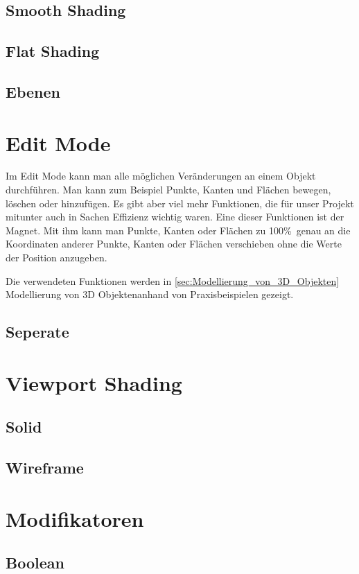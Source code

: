 \subsection{Smooth Shading}
\subsection{Flat Shading}
\subsection{Ebenen}

\section{Edit Mode}
Im Edit Mode kann man alle möglichen Veränderungen an einem Objekt durchführen. Man kann zum Beispiel Punkte, Kanten und Flächen bewegen, löschen oder hinzufügen.
Es gibt aber viel mehr Funktionen, die für unser Projekt mitunter auch in Sachen Effizienz wichtig waren. Eine dieser Funktionen ist der Magnet. Mit ihm kann man Punkte, Kanten oder Flächen zu 100\%\ genau an
die Koordinaten anderer Punkte, Kanten oder Flächen verschieben ohne die Werte der Position anzugeben.

Die verwendeten Funktionen werden in  \autoref{sec:Modellierung_von_3D_Objekten} \dq  Modellierung von 3D Objekten\dq anhand von
Praxisbeispielen gezeigt.

\subsection{Seperate}

\section{Viewport Shading}
\subsection{Solid}
\subsection{Wireframe}

\section{Modifikatoren}
\subsection{Boolean}
